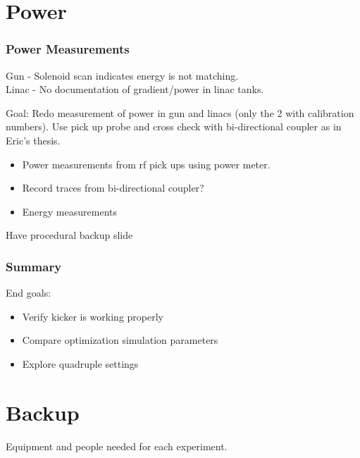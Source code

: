 \documentclass[professionalfonts,t]{beamer}
\begin{document}
\section{Power}
\begin{frame}
	\frametitle{Power Measurements}
	Gun - Solenoid scan indicates energy is not matching. \\
	Linac - No documentation of gradient/power in linac tanks. 
	\vspace{1em}
	
	Goal: Redo measurement of power in gun and linacs (only the 2 with calibration numbers). 
	Use pick up probe and cross check with bi-directional coupler as in Eric's thesis.
	
	\vspace{1em}
	\begin{itemize}
		\item Power measurements from rf pick ups using power meter.
		\item Record traces from bi-directional coupler?
		\item Energy measurements
	\end{itemize} 

Have procedural backup slide
\end{frame}


\begin{frame}
	\frametitle{Summary}
	End goals:
	\begin{itemize}
		\item Verify kicker is working properly
		\item Compare optimization simulation parameters
		\item Explore quadruple settings
	\end{itemize}
	
	
	
\end{frame}



\section{Backup}
\begin{frame}
	Equipment and people needed for each experiment.
\end{frame}
\end{document}
